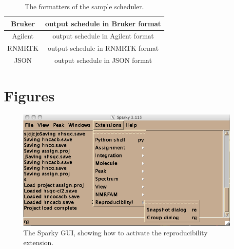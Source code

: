 \begin{table}[h]
  \begin{tabular}{ | c | c | }
    \hline
    Bruker      &  output schedule in Bruker format  \\  \hline
    Agilent     &  output schedule in Agilent format  \\  \hline
    RNMRTK      &  output schedule in RNMRTK format  \\  \hline
    JSON      &  output schedule in JSON format  \\  \hline
  \end{tabular}
  \caption{The formatters of the sample scheduler.}
  \label{scheduler_formatters}
\end{table}



\clearpage
\section{Figures}

\begin{figure}[h]
  \includegraphics[scale=0.6]{figures/sparky_extensions}
  \caption{The Sparky GUI, showing how to activate the reproducibility
           extension.}
  \label{sparky_extensions}
\end{figure}

